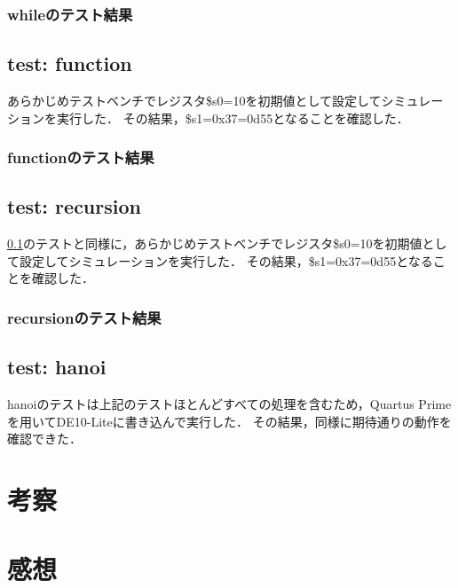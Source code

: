 \documentclass[dvipdfmx]{jsarticle}
\begin{document}
\subsubsection{whileのテスト結果}


\subsection{test: function}
\label{sec:function}
あらかじめテストベンチでレジスタ\$s0=10を初期値として設定してシミュレーションを実行した．
その結果，\$s1=0x37=0d55となることを確認した．
\subsubsection{functionのテスト結果}


\subsection{test: recursion}
\ref{sec:function}のテストと同様に，あらかじめテストベンチでレジスタ\$s0=10を初期値として設定してシミュレーションを実行した．
その結果，\$s1=0x37=0d55となることを確認した．
\subsubsection{recursionのテスト結果}


\subsection{test: hanoi}

hanoiのテストは上記のテストほとんどすべての処理を含むため，Quartus Primeを用いてDE10-Liteに書き込んで実行した．
その結果，同様に期待通りの動作を確認できた．




\section{考察}



\section{感想}





\end{document}
